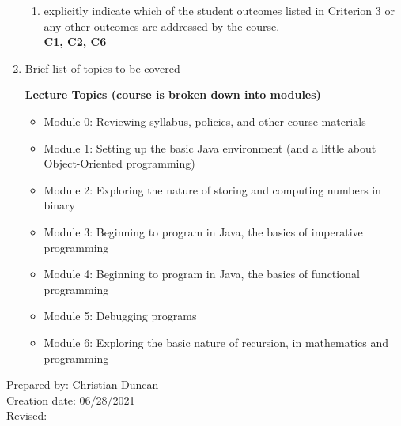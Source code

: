 \begin{enumerate}[1.]
\begin{enumerate}
\item explicitly indicate which of the student outcomes listed in Criterion 3 or any other outcomes are addressed by the course.\\
  {\bfseries
    C1,
    C2,
    C6
  }
\end{enumerate}

\item Brief list of topics to be covered\\
  {\bfseries
    Lecture Topics (course is broken down into modules)
    \begin{itemize}
    \item Module 0: Reviewing syllabus, policies, and other course materials
    \item Module 1: Setting up the basic Java environment (and a little about Object-Oriented programming)
    \item Module 2: Exploring the nature of storing and computing numbers in binary
    \item Module 3: Beginning to program in Java, the basics of imperative programming
    \item Module 4: Beginning to program in Java, the basics of functional programming
    \item Module 5: Debugging programs
    \item Module 6: Exploring the basic nature of recursion, in mathematics and programming
    \end{itemize}
  }

\end{enumerate}

\noindent Prepared by: Christian Duncan\\
\noindent Creation date: 06/28/2021\\
\noindent Revised:\\
